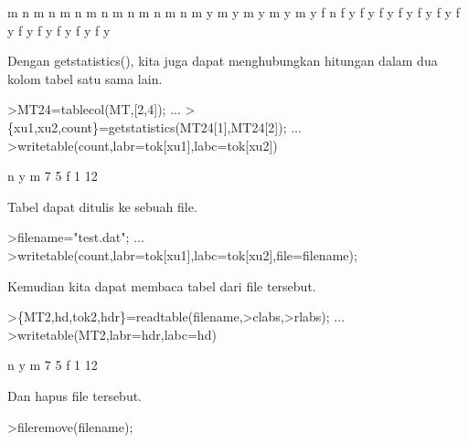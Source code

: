 \documentclass[a4paper,10pt]{article}
\begin{document}
\begin{eulernotebook}
\begin{eulercomment}
\begin{eulercomment}
\begin{eulercomment}
\begin{eulercomment}
\begin{euleroutput}
           m         n
           m         n
           m         n
           m         n
           m         n
           m         n
           m         n
           m         y
           m         y
           m         y
           m         y
           m         y
           f         n
           f         y
           f         y
           f         y
           f         y
           f         y
           f         y
           f         y
           f         y
           f         y
           f         y
           f         y
           f         y
\end{euleroutput}
\begin{eulercomment}
Dengan getstatistics(), kita juga dapat menghubungkan hitungan dalam
dua kolom tabel satu sama lain.
\end{eulercomment}
\begin{eulerprompt}
>MT24=tablecol(MT,[2,4]); ...
>\{xu1,xu2,count\}=getstatistics(MT24[1],MT24[2]); ...
>writetable(count,labr=tok[xu1],labc=tok[xu2])
\end{eulerprompt}
\begin{euleroutput}
                     n         y
           m         7         5
           f         1        12
\end{euleroutput}
\begin{eulercomment}
Tabel dapat ditulis ke sebuah file.
\end{eulercomment}
\begin{eulerprompt}
>filename="test.dat"; ...
>writetable(count,labr=tok[xu1],labc=tok[xu2],file=filename);
\end{eulerprompt}
\begin{eulercomment}
Kemudian kita dapat membaca tabel dari file tersebut.
\end{eulercomment}
\begin{eulerprompt}
>\{MT2,hd,tok2,hdr\}=readtable(filename,>clabs,>rlabs); ...
>writetable(MT2,labr=hdr,labc=hd)
\end{eulerprompt}
\begin{euleroutput}
                     n         y
           m         7         5
           f         1        12
\end{euleroutput}
\begin{eulercomment}
Dan hapus file tersebut.
\end{eulercomment}
\begin{eulerprompt}
>fileremove(filename);
\end{eulerprompt}

\end{eulercomment}
\end{eulercomment}
\end{eulercomment}
\end{eulercomment}
\end{eulernotebook}
\end{document}
